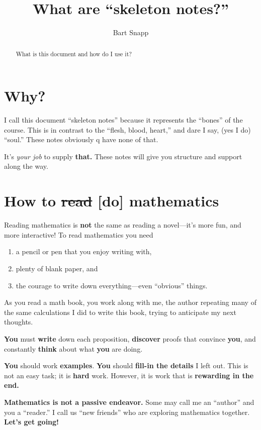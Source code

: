 

\author{Bart Snapp}

\title{What are ``skeleton notes?''}

\begin{abstract}
  What is this document and how do I use it?
\end{abstract}
\maketitle


\section{Why?}

I call this document ``skeleton notes'' because it represents the
``bones'' of the course. This is in contrast to the ``flesh, blood,
heart,'' and dare I say, (yes I do) ``soul.''  These notes obviously q
have none of that.


It's \textit{your job} to supply \textbf{that.} These notes will give
you structure and support along the way.






\section{How to \sout{read} [do] mathematics}

Reading mathematics is \textbf{not} the same as reading a novel---it's
more fun, and more interactive!  To read mathematics you need
\begin{enumerate}
\item a pencil or pen that you enjoy writing with,
\item plenty of blank paper, and
\item the courage to write down everything---even ``obvious'' things.
\end{enumerate}
As you read a math book, you work along with me, the author repeating
many of the same calculations I did to write this book, trying to
anticipate my next thoughts.


\textbf{You} must \textbf{write} down each proposition, \textbf{discover}
proofs that convince \textbf{you}, and constantly \textbf{think} about what \textbf{you}
are doing.

\textbf{You} should work \textbf{examples}.  \textbf{You} should
\textbf{fill-in the details} I left out.  This is not an easy task; it
is \textbf{hard} work. However, it is work that is \textbf{rewarding in the
  end.}



\textbf{Mathematics is not a passive endeavor.}  Some may call me an ``author''
and you a ``reader.'' I call us ``new friends'' who are exploring
mathematics together. \textbf{Let's get going!}




